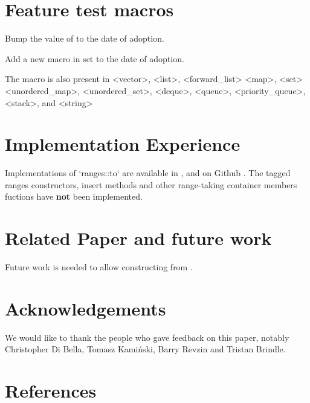 \documentclass{wg21}
\begin{document}
\section{Feature test macros}

Bump the value of  to the date of adoption.

Add a new macro in   set to the date of adoption.

The macro  is also present in
<vector>, <list>, <forward_list> <map>, <set> <unordered_map>, <unordered_set>, <deque>, <queue>, <priority_queue>, <stack>, and <string>


\section{Implementation Experience}

Implementations of `ranges::to` are available in \cite{Range V3}, \cite{cmcstl2} and on Github \cite{rangesnext}.
The tagged ranges constructors, insert methods and other range-taking container members fuctions have \textbf{not} been
implemented.

\section{Related Paper and future work}

Future work is needed to allow constructing  from .

\section{Acknowledgements}
We would like to thank the people who gave feedback on this paper, notably Christopher Di Bella, Tomasz Kamiński, Barry Revzin
and Tristan Brindle.\\

\section{References}
\renewcommand{\section}[2]{}%

\end{document}

